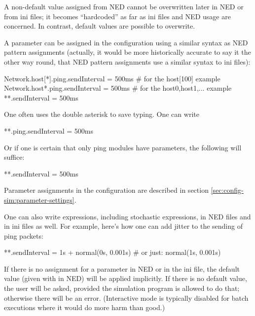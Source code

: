 \begin{important}
    A non-default value assigned from NED cannot be overwritten later in
    NED or from ini files; it becomes ``hardcoded'' as far as ini files
    and NED usage are concerned. In contrast, default values are possible
    to overwrite.
\end{important}

A parameter can be assigned in the configuration using a similar syntax as
NED pattern assignments (actually, it would be more historically accurate
to say it the other way round, that NED pattern assignments use a similar
syntax to ini files):


\begin{inifile}
Network.host[*].ping.sendInterval = 500ms  # for the host[100] example
Network.host*.ping.sendInterval = 500ms    # for the host0,host1,... example
**.sendInterval = 500ms
\end{inifile}

One often uses the double asterisk to save typing. One can write

\begin{inifile}
**.ping.sendInterval = 500ms
\end{inifile}

Or if one is certain that only ping modules have  parameters,
the following will suffice:

\begin{inifile}
**.sendInterval = 500ms
\end{inifile}

Parameter assignments in the configuration are described in section
\ref{sec:config-sim:parameter-settings}.

One can also write expressions, including stochastic expressions, in
NED files and in ini files as well. For example, here's how one can
add jitter to the sending of ping packets:

\begin{inifile}
**.sendInterval = 1s + normal(0s, 0.001s)  # or just: normal(1s, 0.001s)
\end{inifile}

If there is no assignment for a parameter in NED or in the ini file, the
default value (given with  in NED) will be applied
implicitly. If there is no default value, the user will be asked, provided
the simulation program is allowed to do that; otherwise there will be an
error. (Interactive mode is typically disabled for batch executions where
it would do more harm than good.)

